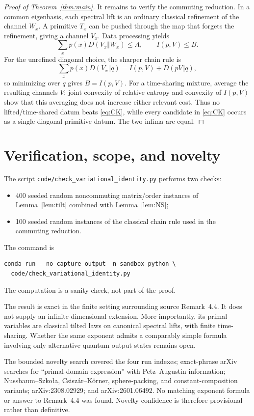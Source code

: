\documentclass[10pt]{article}
\begin{document}
\begin{proof}[Proof of Theorem~\ref{thm:main}]
It remains to verify the commuting reduction. In a common eigenbasis, each
spectral lift is an ordinary classical refinement of the channel $W_x$. A
primitive $T_x$ can be pushed through the map that forgets the refinement,
giving a channel $V_x$. Data processing yields
\[
 \sum_xp(x)D(V_x\Vert W_x)\le A,
 \qquad
 I(p,V)\le B.
\]
For the unrefined diagonal choice, the sharper chain rule is
\[
 \sum_xp(x)D(V_x\Vert q)
 =I(p,V)+D(pV\Vert q),
\]
so minimizing over $q$ gives $B=I(p,V)$. For a time-sharing mixture, average
the resulting channels $V$; joint convexity of relative entropy and convexity
of $I(p,V)$ show that this averaging does not increase either relevant cost.
Thus no lifted/time-shared datum beats \eqref{eq:CK}, while every candidate in
\eqref{eq:CK} occurs as a single diagonal primitive datum. The two infima are
equal.
\end{proof}

\section{\hspace{0.22em}Verification, scope, and novelty}

The script \texttt{code/check\_variational\_identity.py} performs two checks:
\begin{itemize}
\item 400 seeded random noncommuting matrix/order instances of
Lemma~\ref{lem:tilt} combined with Lemma~\ref{lem:NS};
\item 100 seeded random instances of the classical chain rule used in the
commuting reduction.
\end{itemize}
The command is
\begin{verbatim}
conda run --no-capture-output -n sandbox python \
  code/check_variational_identity.py
\end{verbatim}
The computation is a sanity check, not part of the proof.

The result is exact in the finite setting surrounding source Remark~4.4. It
does not supply an infinite-dimensional extension. More importantly, its
primal variables are classical tilted laws on canonical spectral lifts, with
finite time-sharing. Whether the same exponent admits a comparably simple
formula involving only alternative quantum output states remains open.

The bounded novelty search covered the four run indexes; exact-phrase arXiv
searches for ``primal-domain expression'' with Petz--Augustin information;
Nussbaum--Szko\l a, Csisz\'ar--K\"orner, sphere-packing, and
constant-composition variants; arXiv:2308.02929; and arXiv:2601.06492. No
matching exponent formula or answer to Remark~4.4 was found. Novelty confidence
is therefore provisional rather than definitive.
\end{document}
